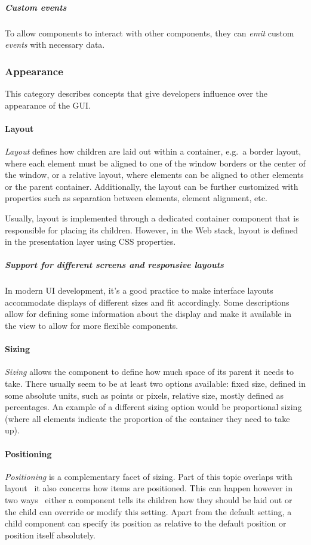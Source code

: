 \subparagraph{Custom events}
To allow components to interact with other components, they can \emph{emit} custom \emph{events} with necessary data.

\subsubsection{Appearance}
This category describes concepts that give developers influence over the appearance of the GUI\@.

\paragraph{Layout}
\emph{Layout} defines how children are laid out within a container, e.g.\ a border layout, where each element must be aligned to one of the window borders or the center of the window, or a relative layout, where elements can be aligned to other elements or the parent container.
Additionally, the layout can be further customized with properties such as separation between elements, element alignment, etc.

Usually, layout is implemented through a dedicated container component that is responsible for placing its children.
However, in the Web stack, layout is defined in the presentation layer using CSS properties.

\subparagraph{Support for different screens and responsive layouts}
In modern UI development, it's a good practice to make interface layouts accommodate displays of different sizes and fit accordingly.
Some descriptions allow for defining some information about the display and make it available in the view to allow for more flexible components.

\paragraph{Sizing}
\emph{Sizing} allows the component to define how much space of its parent it needs to take.
There usually seem to be at least two options available: fixed size, defined in some absolute units, such as points or pixels, relative size, mostly defined as percentages.
An example of a different sizing option would be proportional sizing (where all elements indicate the proportion of the container they need to take up).

\paragraph{Positioning}
\emph{Positioning} is a complementary facet of sizing.
Part of this topic overlaps with layout \textendash\ it also concerns how items are positioned.
This can happen however in two ways \textendash\ either a component tells its children how they should be laid out or the child can override or modify this setting.
Apart from the default setting, a child component can specify its position as relative to the default position or position itself absolutely.

